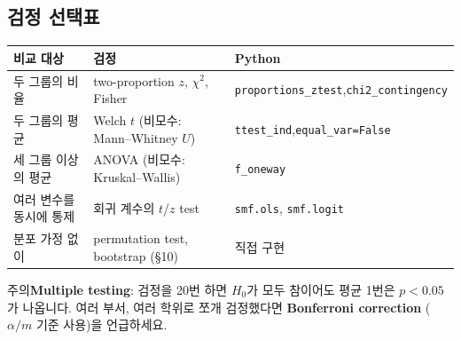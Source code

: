 \documentclass[11pt,a4paper]{article}
\newcommand{\term}[1]{\textbf{#1}}
\newcommand{\warn}{\textsf{\small 주의}\;}
\newcommand{\code}[1]{\texttt{#1}}
\begin{document}
\subsection{검정 선택표}
\begin{center}
\begin{tabular}{@{}l l p{4.2cm}@{}}
\toprule
비교 대상 & 검정 & Python \\
\midrule
두 그룹의 비율 & two-proportion $z$, $\chi^2$, Fisher & \code{proportions\_ztest},\newline \code{chi2\_contingency} \\
두 그룹의 평균 & Welch $t$ (비모수: Mann–Whitney $U$) & \code{ttest\_ind},\newline \code{equal\_var=False} \\
세 그룹 이상의 평균 & ANOVA (비모수: Kruskal–Wallis) & \code{f\_oneway} \\
여러 변수를 동시에 통제 & 회귀 계수의 $t$/$z$ test & \code{smf.ols}, \code{smf.logit} \\
분포 가정 없이 & permutation test, bootstrap (\S10) & 직접 구현 \\
\bottomrule
\end{tabular}
\end{center}

\warn \term{Multiple testing}: 검정을 20번 하면 $H_0$가 모두 참이어도 평균 1번은 $p<0.05$가 나옵니다. 여러 부서, 여러 학위로 쪼개 검정했다면 \term{Bonferroni correction} ($\alpha/m$ 기준 사용)을 언급하세요.
\end{document}
